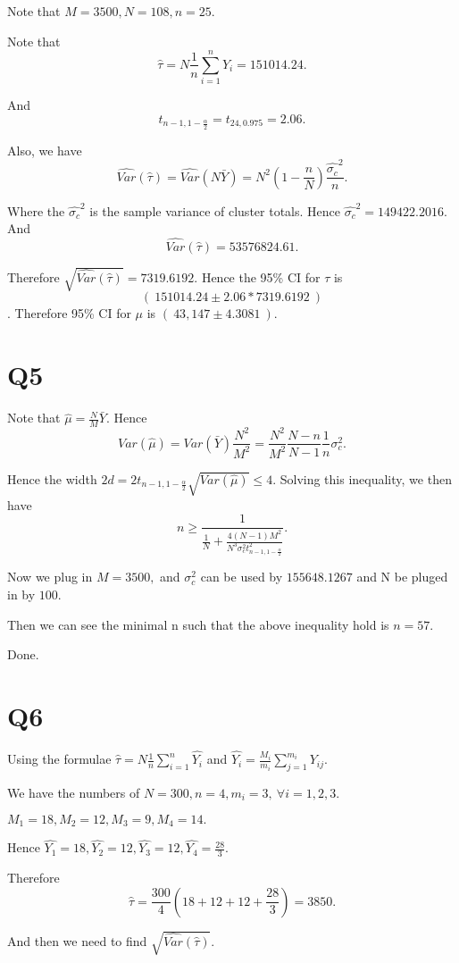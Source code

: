 \documentclass[12pt]{article}%
\begin{document}
Note that $M=3500, N=108, n=25.$ 

Note that $$\hat{\tau}=N\frac{1}{n}\sum_{i=1}^{n}Y_i=151014.24.$$

And $$t_{n-1,1-\frac{\alpha}{2}}=t_{24,0.975}=2.06.$$

Also, we have $$\hat{Var}(\hat{\tau})=\hat{Var}(N\bar{Y})=N^2(1-\frac{n}{N})\frac{\hat{\sigma_c}^2}{n}.$$

Where the $\hat{\sigma_c}^2$ is the sample variance of cluster totals. Hence $\hat{\sigma_c}^2=149422.2016.$ And $$\hat{Var}(\hat{\tau})=53576824.61.$$

Therefore $\sqrt{\hat{Var}(\hat{\tau})}=7319.6192.$ Hence the 95\% CI for $\tau$ is $$(~151014.24 \pm 2.06*7319.6192~)$$. Therefore 95\% CI for $\mu$ is $(~43,147 \pm 4.3081~).$


\section{Q5}
Note that $\hat{\mu}=\frac{N}{M}\bar{Y}.$ Hence $$Var(\hat{\mu})=Var(\bar{Y})\frac{N^2}{M^2}=\frac{N^2}{M^2}\frac{N-n}{N-1}\frac{1}{n}\sigma_c^2.$$

Hence the width $2d=2t_{n-1,1-\frac{\alpha}{2}}\sqrt{Var(\hat{\mu})} \leq 4.$ Solving this inequality, we then have $$n \geq \frac{1}{\frac{1}{N} + \frac{4(N-1)M^2}{N^3 \sigma_c^2 t_{n-1,1-\frac{\alpha}{2}}^2 } }.$$ 

Now we plug in $M=3500,$ and $\sigma_c^2$ can be used by $155648.1267$ and N be pluged in by $100$. 

Then we can see the minimal n such that the above inequality hold is $n=57$.

Done. 


\section{Q6}
Using the formulae $\hat{\tau}=N\frac{1}{n} \sum_{i=1}^{n}\hat{Y_i}$ and $\hat{Y_i}=\frac{M_i}{m_i}\sum_{j=1}^{m_i}Y_{ij}.$ 

We have the numbers of $N=300, n=4, m_i=3,~ \forall i=1,2,3.$

$M_1 = 18, M_2 = 12, M_3 = 9, M_4 = 14.$

Hence $\hat{Y_1} = 18, \hat{Y_2} = 12, \hat{Y_3} = 12, \hat{Y_4} = \frac{28}{3}.$

Therefore $$\hat{\tau} = \frac{300}{4}(18+12+12+\frac{28}{3})=3850.$$ 

And then we need to find $\sqrt{\hat{Var}(\hat{\tau})}.$
\end{document}
